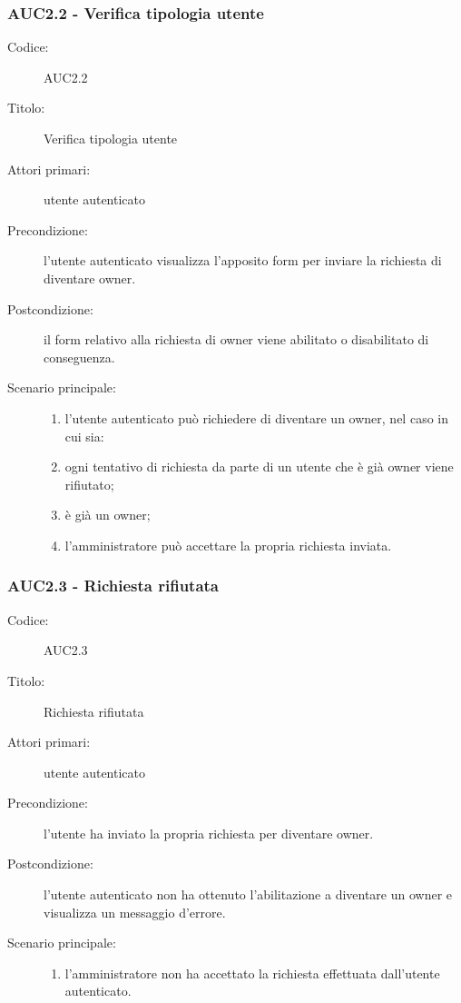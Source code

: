\documentclass[../../../analisi-dei-requisiti.tex]{subfiles}
\begin{document}
\subsubsection{AUC2.2 - Verifica tipologia utente}%
\label{subs:AUC2.2}
\begin{description}
  \item[Codice:] AUC2.2
  \item[Titolo:] Verifica tipologia utente
  \item[Attori primari:] utente autenticato
  \item[Precondizione:] l'utente autenticato visualizza l'apposito form per inviare la richiesta di diventare owner.
  \item[Postcondizione:] il form relativo alla richiesta di owner viene abilitato o disabilitato di conseguenza.
  \item[Scenario principale:]
  \begin{enumerate}
    \item l'utente autenticato può richiedere di diventare un owner, nel caso in cui sia:
    \item ogni tentativo di richiesta da parte di un utente che è già owner viene rifiutato;
    \item {} è già un owner;
    \item l'amministratore può accettare la propria richiesta inviata.
  \end{enumerate}
\end{description}

\subsubsection{AUC2.3 - Richiesta rifiutata}%
\label{subs:AUC2.3}
\begin{description}
  \item[Codice:] AUC2.3
  \item[Titolo:] Richiesta rifiutata
  \item[Attori primari:] utente autenticato
  \item[Precondizione:] l'utente ha inviato la propria richiesta per diventare owner.
  \item[Postcondizione:] l'utente autenticato non ha ottenuto l'abilitazione a diventare un owner e visualizza un messaggio d'errore.
  \item[Scenario principale:]
  \begin{enumerate}
    \item l'amministratore non ha accettato la richiesta effettuata dall'utente autenticato.
  \end{enumerate}
\end{description}
\end{document}
